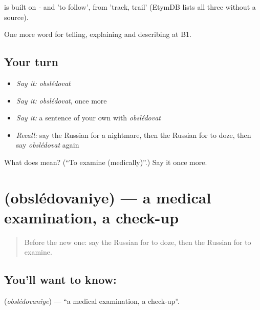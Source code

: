 \begin{cousinweb}
\emph{} is built on \emph{-} and \emph{} 'to follow', from \emph{} 'track, trail' (EtymDB lists all three without a source).
\end{cousinweb}

\begin{grammarlens}[title={What you've built}]
One more word for telling, explaining and describing at B1.
\end{grammarlens}

\subsection*{Your turn}
\begin{itemize}
\raggedright
  \item \emph{Say it:} \emph{obslédovat}
  \item \emph{Say it:} \emph{obslédovat}, once more
  \item \emph{Say it:} a sentence of your own with \emph{obslédovat}
  \item \emph{Recall:} say the Russian for a nightmare, then the Russian for to doze, then say \emph{obslédovat} again
\end{itemize}

\begin{tcolorbox}[breakable,colback=teal!4,colframe=teal!35!black,title={Before you move on}]
What does  mean? (\textquotedblleft{}To examine (medically)\textquotedblright{}.) Say it once more.
\end{tcolorbox}
\section[\texorpdfstring{\ru{обследование} (obslédovaniye)}{обследование (obslédovaniye)}]{ (obslédovaniye) — a medical examination, a check-up}

\label{lesson:RU-C489-obsledovaniye}



\begin{quote}
Before the new one: say the Russian for to doze, then the Russian for to examine.
\end{quote}

\subsection*{You'll want to know: }
\textbf{} (\emph{obslédovaniye}) — \textquotedblleft{}a medical examination, a check-up\textquotedblright{}.


